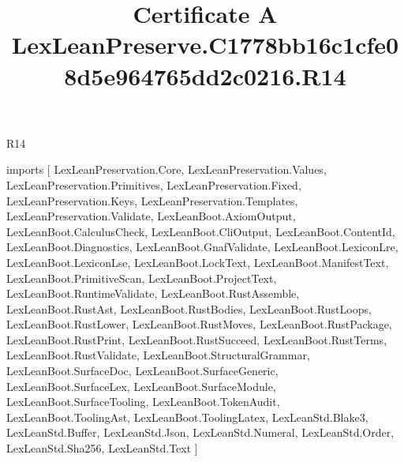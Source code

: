 \begin{lexlean}{R14}
\title{Certificate A LexLeanPreserve.C1778bb16c1cfe08d5e964765dd2c0216.R14}
\begin{coremodule}
imports [
  LexLeanPreservation.Core,
  LexLeanPreservation.Values,
  LexLeanPreservation.Primitives,
  LexLeanPreservation.Fixed,
  LexLeanPreservation.Keys,
  LexLeanPreservation.Templates,
  LexLeanPreservation.Validate,
  LexLeanBoot.AxiomOutput,
  LexLeanBoot.CalculusCheck,
  LexLeanBoot.CliOutput,
  LexLeanBoot.ContentId,
  LexLeanBoot.Diagnostics,
  LexLeanBoot.GnafValidate,
  LexLeanBoot.LexiconLre,
  LexLeanBoot.LexiconLse,
  LexLeanBoot.LockText,
  LexLeanBoot.ManifestText,
  LexLeanBoot.PrimitiveScan,
  LexLeanBoot.ProjectText,
  LexLeanBoot.RuntimeValidate,
  LexLeanBoot.RustAssemble,
  LexLeanBoot.RustAst,
  LexLeanBoot.RustBodies,
  LexLeanBoot.RustLoops,
  LexLeanBoot.RustLower,
  LexLeanBoot.RustMoves,
  LexLeanBoot.RustPackage,
  LexLeanBoot.RustPrint,
  LexLeanBoot.RustSucceed,
  LexLeanBoot.RustTerms,
  LexLeanBoot.RustValidate,
  LexLeanBoot.StructuralGrammar,
  LexLeanBoot.SurfaceDoc,
  LexLeanBoot.SurfaceGeneric,
  LexLeanBoot.SurfaceLex,
  LexLeanBoot.SurfaceModule,
  LexLeanBoot.SurfaceTooling,
  LexLeanBoot.TokenAudit,
  LexLeanBoot.ToolingAst,
  LexLeanBoot.ToolingLatex,
  LexLeanStd.Blake3,
  LexLeanStd.Buffer,
  LexLeanStd.Json,
  LexLeanStd.Numeral,
  LexLeanStd.Order,
  LexLeanStd.Sha256,
  LexLeanStd.Text
]


\end{coremodule}
\end{lexlean}
